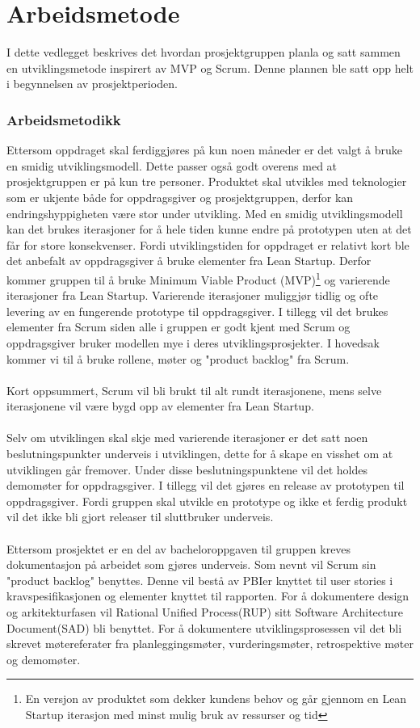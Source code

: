 
\chapter{Arbeidsmetode}
\label{app:arbeidsmetode}
I dette vedlegget beskrives det hvordan prosjektgruppen planla og satt sammen en utviklingsmetode inspirert av MVP og Scrum. Denne plannen ble satt opp helt i begynnelsen av prosjektperioden. 

\subsection{Arbeidsmetodikk}
\label{app:arbeidsmetode_arbeidsmetodikk}
Ettersom oppdraget skal ferdiggjøres på kun noen måneder er det valgt å bruke en smidig utviklingsmodell. Dette passer også godt overens med at prosjektgruppen er på kun tre personer. Produktet skal utvikles med teknologier som er ukjente både for oppdragsgiver og prosjektgruppen, derfor kan endringshyppigheten være stor under utvikling. Med en smidig utviklingsmodell kan det brukes iterasjoner for å hele tiden kunne endre på prototypen uten at det får for store konsekvenser. Fordi utviklingstiden for oppdraget er relativt kort ble det anbefalt av oppdragsgiver å bruke elementer fra Lean Startup. Derfor kommer gruppen til å bruke  Minimum Viable Product (MVP)\footnote{En versjon av produktet som dekker kundens behov og går gjennom en Lean Startup iterasjon med minst mulig bruk av ressurser og tid} og varierende iterasjoner fra Lean Startup. Varierende iterasjoner muliggjør tidlig og ofte levering av en fungerende prototype til oppdragsgiver. I tillegg vil det brukes elementer fra Scrum siden alle i gruppen er godt kjent med Scrum og oppdragsgiver bruker modellen mye i deres utviklingsprosjekter. I hovedsak kommer vi til å bruke rollene, møter og "product backlog" fra Scrum.
\\
\\
Kort oppsummert, Scrum vil bli brukt til alt rundt iterasjonene, mens selve iterasjonene vil være bygd opp av elementer fra Lean Startup.
\\
\\
Selv om utviklingen skal skje med varierende iterasjoner er det satt noen beslutningspunkter underveis i utviklingen, dette for å skape en visshet om at utviklingen går fremover. Under disse beslutningspunktene vil det holdes demomøter for oppdragsgiver. I tillegg vil det gjøres en release av prototypen til oppdragsgiver. Fordi gruppen skal utvikle en prototype og ikke et ferdig produkt vil det ikke bli gjort releaser til sluttbruker underveis.
\\
\\
Ettersom prosjektet er en del av bacheloroppgaven til gruppen kreves dokumentasjon på arbeidet som gjøres underveis. Som nevnt vil Scrum sin "product backlog" benyttes. Denne vil bestå av PBIer knyttet til user stories i kravspesifikasjonen og elementer knyttet til rapporten. For å dokumentere design og arkitekturfasen vil Rational Unified Process(RUP) sitt Software Architecture Document(SAD) bli benyttet. For å dokumentere utviklingsprosessen vil det bli skrevet møtereferater fra planleggingsmøter, vurderingsmøter, retrospektive møter og demomøter.

